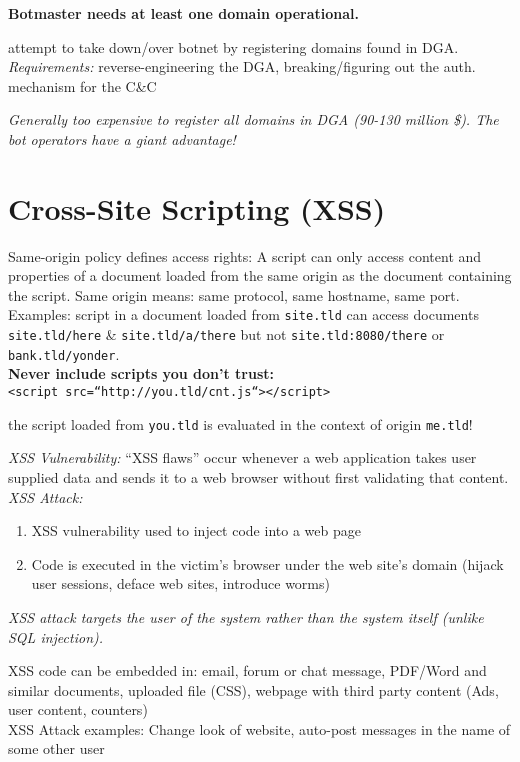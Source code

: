 \textbf{Botmaster needs at least one domain operational.}

 attempt to take down/over botnet by registering domains found in DGA.\\
\emph{Requirements:} reverse-engineering the DGA, breaking/figuring out the auth. mechanism for the C\&C

\textit{Generally too expensive to register all domains in DGA (90-130 million \$). The bot operators have a giant advantage!}

\section{Cross-Site Scripting (XSS)}

 Same-origin policy defines access rights: A script can
only access content and properties of a document loaded from the same origin as the document containing the script. Same origin means: same protocol, same hostname, same port.\\ Examples: script in a document loaded from {\tt site.tld} can access documents {\tt site.tld/here} \& {\tt site.tld/a/there} but not {\tt site.tld:8080/there} or {\tt bank.tld/yonder}.\\
\textbf{Never include scripts you don't trust:} \\
{\tt <script src=“http://you.tld/cnt.js“></script>}

the script loaded from {\tt you.tld} is evaluated in the context of origin {\tt me.tld}! 

 \textit{XSS Vulnerability:} ``XSS flaws'' occur whenever a web application takes user supplied data and sends it to a web browser without first validating that content.\\
\textit{XSS Attack:} 
\begin{enumerate}
\item XSS vulnerability used to inject code into a web page
\item Code is executed in the victim's browser under the web site's domain (hijack user sessions, deface web sites, introduce worms)
\end{enumerate}

\textit{XSS attack targets the user of the system rather than the system itself (unlike SQL injection).}

 XSS code can be embedded in: email, forum or chat message, PDF/Word and similar documents, uploaded file (CSS), webpage with third party content (Ads, user content, counters) \\
XSS Attack examples: Change look of website, auto-post messages in the name of some other user

